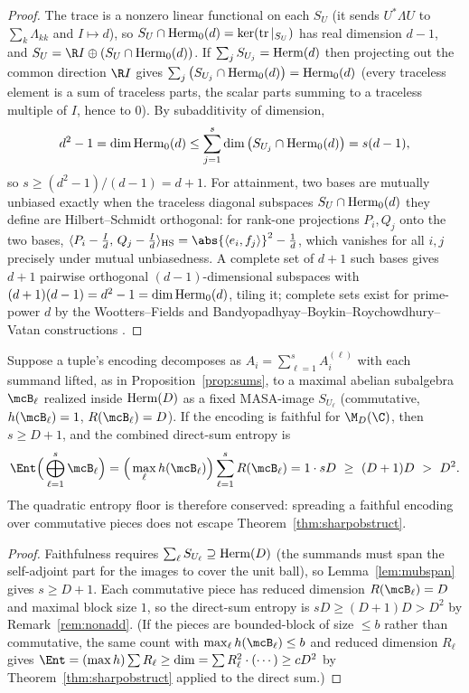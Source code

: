 \begin{proof}
The trace is a nonzero linear functional on each $S_U$ (it sends $U^*\Lambda U$ to
$\sum_k\Lambda_{kk}$ and $I\mapsto d$), so
$S_U\cap\mathrm{Herm}_0(d)=\ker(\operatorname{tr}|_{S_U})$ has real dimension $d-1$, and
$S_U=\R I\oplus(S_U\cap\Herm_0(d))$. If $\sum_j S_{U_j}=\mathrm{Herm}(d)$ then projecting
out the common direction $\R I$ gives
$\sum_j\big(S_{U_j}\cap\mathrm{Herm}_0(d)\big)=\mathrm{Herm}_0(d)$ (every traceless element is a
sum of traceless parts, the scalar parts summing to a traceless multiple of $I$,
hence to $0$). By subadditivity of dimension,
\[
d^2-1=\dim\mathrm{Herm}_0(d)\le\sum_{j=1}^s\dim\big(S_{U_j}\cap\mathrm{Herm}_0(d)\big)=s(d-1),
\]
so $s\ge(d^2-1)/(d-1)=d+1$. For attainment, two bases are mutually unbiased
exactly when the traceless diagonal subspaces $S_{U}\cap\mathrm{Herm}_0(d)$ they define are
Hilbert--Schmidt orthogonal: for rank-one projections $P_i,Q_j$ onto the two bases,
$\langle P_i-\tfrac Id,\,Q_j-\tfrac Id\rangle_{\HS}=\abs{\langle e_i,f_j\rangle}^2-\tfrac1d$,
which vanishes for all $i,j$ precisely under mutual unbiasedness. A complete set of
$d+1$ such bases gives $d+1$ pairwise orthogonal $(d-1)$-dimensional subspaces with
$(d+1)(d-1)=d^2-1=\dim\mathrm{Herm}_0(d)$, tiling it; complete sets exist for prime-power
$d$ by the Wootters--Fields and Bandyopadhyay--Boykin--Roychowdhury--Vatan
constructions \cite{WoottersFields,BBRV}.
\end{proof}

\begin{proposition}
\label{prop:sumfloor}
Suppose a tuple's encoding decomposes as $A_i=\sum_{\ell=1}^s A_i^{(\ell)}$ with
each summand lifted, as in Proposition~\ref{prop:sums}, to a maximal abelian
subalgebra $\mcB_\ell$ realized inside $\mathrm{Herm}(D)$ as a fixed MASA-image $S_{U_\ell}$
(commutative, $h(\mcB_\ell)=1$, $R(\mcB_\ell)=D$). If the encoding is faithful for
$\M_D(\C)$, then $s\ge D+1$, and the combined direct-sum entropy is
\[
\Ent\Big(\bigoplus_{\ell=1}^s\mcB_\ell\Big)
=\Big(\max_\ell h(\mcB_\ell)\Big)\sum_{\ell=1}^s R(\mcB_\ell)
=1\cdot sD\ \ge\ (D+1)D\ >\ D^2 .
\]
The quadratic entropy floor is therefore conserved: spreading a faithful encoding
over commutative pieces does not escape Theorem~\ref{thm:sharpobstruct}.
\end{proposition}

\begin{proof}
Faithfulness requires $\sum_\ell S_{U_\ell}\supseteq\mathrm{Herm}(D)$ (the summands must
span the self-adjoint part for the images to cover the unit ball), so
Lemma~\ref{lem:mubspan} gives $s\ge D+1$. Each commutative piece has reduced
dimension $R(\mcB_\ell)=D$ and maximal block size $1$, so the direct-sum entropy is
$sD\ge(D+1)D>D^2$ by Remark~\ref{rem:nonadd}. (If the pieces are bounded-block of
size $\le b$ rather than commutative, the same count with
$\max_\ell h(\mcB_\ell)\le b$ and reduced dimension $R_\ell$ gives
$\Ent=(\max h)\sum R_\ell\ge\dim=\sum R_\ell^2\cdot(\cdots)\ge cD^2$ by
Theorem~\ref{thm:sharpobstruct} applied to the direct sum.)
\end{proof}

